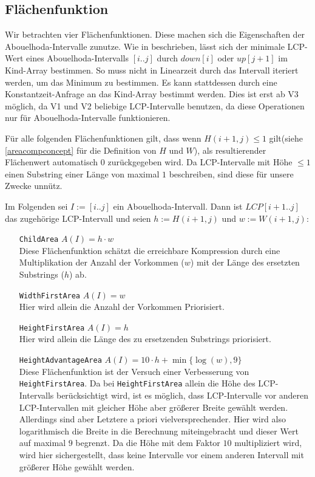 \subsection{Flächenfunktion}

Wir betrachten vier Flächenfunktionen. Diese machen sich die Eigenschaften der Abouelhoda-Intervalle zunutze. 
Wie in \cite{abouelhoda_optimal_2002} beschrieben, lässt sich der minimale LCP-Wert eines Abouelhoda-Intervalls $[i..j]$ durch $down[i]$ oder $up[j+1]$ im Kind-Array bestimmen. 
So muss nicht in Linearzeit durch das Intervall iteriert werden, um das Minimum zu bestimmen. Es kann stattdessen durch eine Konstantzeit-Anfrage an das Kind-Array bestimmt werden. Dies ist erst ab V3 möglich, da V1 und V2 beliebige LCP-Intervalle benutzen, da diese Operationen nur für Abouelhoda-Intervalle funktionieren.

Für alle folgenden Flächenfunktionen gilt, dass wenn $H(i+1, j) \leq 1$ gilt(siehe \autoref{areacompconcept} für die Definition von $H$ und $W$), als resultierender Flächenwert automatisch $0$ zurückgegeben wird. Da LCP-Intervalle mit Höhe $\leq 1$ einen Substring einer Länge von maximal $1$ beschreiben, sind diese für unsere Zwecke unnütz.  

Im Folgenden sei $I := [i..j]$ ein Abouelhoda-Intervall. Dann ist $LCP[i+1..j]$ das zugehörige LCP-Intervall und seien $h := H(i+1, j)$ und $w := W(i+1, j)$:

\begin{itemize}[leftmargin=3.3cm]
    \item[\texttt{ChildArea}] $A(I) = h \cdot w$\\
    Diese Flächenfunktion schätzt die erreichbare Kompression durch eine Multiplikation der Anzahl der Vorkommen ($w$) mit der Länge des ersetzten Substrings ($h$) ab.
    \item[\texttt{WidthFirstArea}] $A(I) = w$\\ Hier wird allein die Anzahl der Vorkommen Priorisiert.
    \item[\texttt{HeightFirstArea}] $A(I) = h$\\
    Hier wird allein die Länge des zu ersetzenden Substrings priorisiert.
    \item[\texttt{HeightAdvantageArea}] $A(I) = 10 \cdot h + \min\{\log(w), 9\}$\\ Diese Flächenfunktion ist der Versuch einer Verbesserung von \\
    \texttt{HeightFirstArea}. Da bei \texttt{HeightFirstArea} allein die Höhe des LCP-Intervalls berücksichtigt wird, ist es möglich, dass LCP-Intervalle vor anderen LCP-Intervallen mit gleicher Höhe aber größerer Breite gewählt werden. Allerdings sind aber Letztere a priori vielversprechender. Hier wird also logarithmisch die Breite in die Berechnung miteingebracht und dieser Wert auf maximal $9$ begrenzt. Da die Höhe mit dem Faktor $10$ multipliziert wird, wird hier sichergestellt, dass keine Intervalle vor einem anderen Intervall mit größerer Höhe gewählt werden.
\end{itemize}



